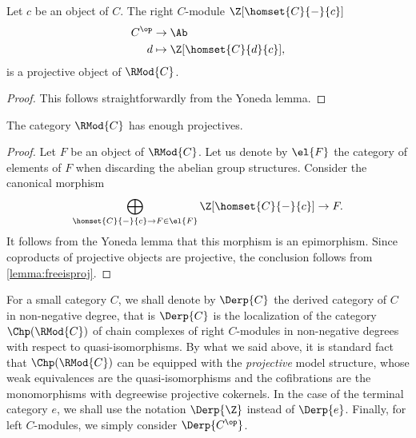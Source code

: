 \begin{lemma}\label{lemma:freeisproj}
  Let $c$ be an object of $C$. The right $C$\nbd-module $\Z[\homset{C}{-}{c}]$
  \[
    \begin{aligned}
      C^{\op} &\to \Ab\\
      d &\mapsto \Z[\homset{C}{d}{c}],
    \end{aligned}
  \]
  is a projective object of $\RMod{C}$.
\end{lemma}
\begin{proof}
  This follows straightforwardly from the Yoneda lemma.
\end{proof}
\begin{proposition}\label{prop:enoughproj}
  The category $\RMod{C}$ has enough projectives.
\end{proposition}
\begin{proof}
  Let $F$ be an object of $\RMod{C}$. Let us denote by $\el{F}$ the
  category of elements of $F$ when discarding the abelian group
  structures. Consider the canonical
  morphism
  \[
    \bigoplus_{\homset{C}{-}{c} \to F \in \el{F}} \Z[\homset{C}{-}{c}] \to F.
  \]
 It follows from the Yoneda lemma that this morphism is
  an epimorphism. Since coproducts of projective objects
  are projective, the conclusion follows from \cref{lemma:freeisproj}.
\end{proof}
\begin{paragr}
 For a small category $C$, we shall denote by $\Derp{C}$ the derived
 category of $C$ in non-negative degree, that is $\Derp{C}$ is the
 localization of the category $\Chp(\RMod{C})$ of chain complexes of
 right $C$\nbd-modules in non-negative degrees with respect to
 quasi-isomorphisms. By what we said above, it is standard fact that
 $\Chp(\RMod{C})$ can be equipped with the \emph{projective} model
 structure, whose weak equivalences are the quasi-isomorphisms and the
 cofibrations are the monomorphisms with degreewise projective
 cokernels. In the case of the terminal category $e$, we shall use the
 notation $\Derp{\Z}$ instead of $\Derp{e}$. Finally, for left $C$\nbd-modules, we simply consider $\Derp{C^{\op}}$.
\end{paragr}
